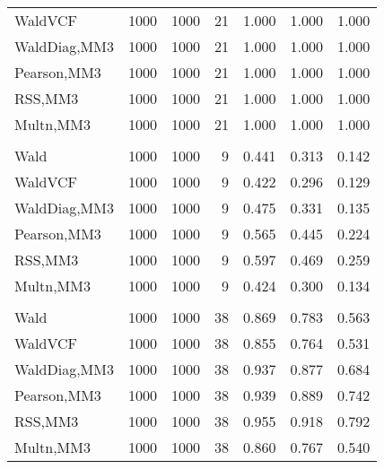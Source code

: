 \documentclass[
]{article}
\begin{document}
\begin{table}[H]
{\begin{tabular}[t]{lrrrrrr}
\hspace{1em}WaldVCF & 1000 & 1000 & 21 & 1.000 & 1.000 & 1.000\\
\hspace{1em}WaldDiag,MM3 & 1000 & 1000 & 21 & 1.000 & 1.000 & 1.000\\
\hspace{1em}Pearson,MM3 & 1000 & 1000 & 21 & 1.000 & 1.000 & 1.000\\
\hspace{1em}RSS,MM3 & 1000 & 1000 & 21 & 1.000 & 1.000 & 1.000\\
\hspace{1em}Multn,MM3 & 1000 & 1000 & 21 & 1.000 & 1.000 & 1.000\\
\addlinespace[0.3em]
\multicolumn{7}{l}{\textbf{2F 10V}}\\
\hspace{1em}Wald & 1000 & 1000 & 9 & 0.441 & 0.313 & 0.142\\
\hspace{1em}WaldVCF & 1000 & 1000 & 9 & 0.422 & 0.296 & 0.129\\
\hspace{1em}WaldDiag,MM3 & 1000 & 1000 & 9 & 0.475 & 0.331 & 0.135\\
\hspace{1em}Pearson,MM3 & 1000 & 1000 & 9 & 0.565 & 0.445 & 0.224\\
\hspace{1em}RSS,MM3 & 1000 & 1000 & 9 & 0.597 & 0.469 & 0.259\\
\hspace{1em}Multn,MM3 & 1000 & 1000 & 9 & 0.424 & 0.300 & 0.134\\
\addlinespace[0.3em]
\multicolumn{7}{l}{\textbf{3F 15V}}\\
\hspace{1em}Wald & 1000 & 1000 & 38 & 0.869 & 0.783 & 0.563\\
\hspace{1em}WaldVCF & 1000 & 1000 & 38 & 0.855 & 0.764 & 0.531\\
\hspace{1em}WaldDiag,MM3 & 1000 & 1000 & 38 & 0.937 & 0.877 & 0.684\\
\hspace{1em}Pearson,MM3 & 1000 & 1000 & 38 & 0.939 & 0.889 & 0.742\\
\hspace{1em}RSS,MM3 & 1000 & 1000 & 38 & 0.955 & 0.918 & 0.792\\
\hspace{1em}Multn,MM3 & 1000 & 1000 & 38 & 0.860 & 0.767 & 0.540\\
\bottomrule
\end{tabular}}
\endgroup{}
\end{table}
\end{document}
